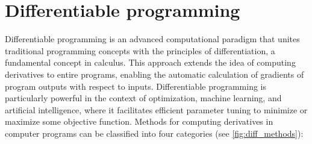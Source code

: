 \section{Differentiable programming}
\label{sec:diff_prog}

Differentiable programming is an advanced computational paradigm that unites traditional programming concepts with the principles of differentiation, a fundamental concept in calculus. This approach extends the idea of computing derivatives to entire programs, enabling the automatic calculation of gradients of program outputs with respect to inputs. Differentiable programming is particularly powerful in the context of optimization, machine learning, and artificial intelligence, where it facilitates efficient parameter tuning to minimize or maximize some objective function.
Methods for computing derivatives in computer programs can be classified into four categories (see \cref{fig:diff_methods}):
